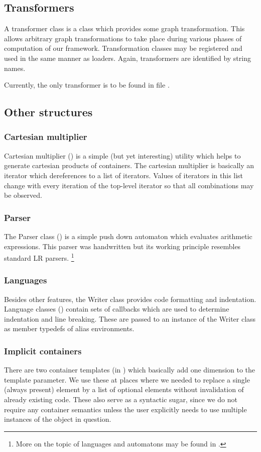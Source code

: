 \subsection*{Transformers}
  A transformer class is a class which provides some graph transformation. This allows arbitrary graph transformations to take place during various phases of computation of our framework. Transformation classes may be registered and used in the same manner as loaders. Again, transformers are identified by string names.

  Currently, the only transformer is to be found in file .

\subsection*{Other structures}

\subsubsection{Cartesian multiplier}
   Cartesian multiplier () is a simple (but yet interesting) utility which helps to generate cartesian products of containers. The cartesian multiplier is basically an iterator which dereferences to a list of iterators. Values of iterators in this list change with every iteration of the top-level iterator so that all combinations may be observed.

\subsubsection{Parser}
  The Parser class () is a simple push down automaton which evaluates arithmetic expressions. This parser was handwritten but its working principle resembles standard LR parsers. \footnote{More on the topic of languages and automatons may be found in \cite{automatons}.}

\subsubsection{Languages}
  Besides other features, the Writer class provides code formatting and indentation. Language classes () contain sets of callbacks which are used to determine indentation and line breaking. These are passed to an instance of the Writer class as member typedefs of alias environments.

\subsubsection{Implicit containers}
  There are two container templates (in ) which basically add one dimension to the template parameter. We use these at places where we needed to replace a single (always present) element by a list of optional elements without invalidation of already existing code. These also serve as a syntactic sugar, since we do not require any container semantics unless the user explicitly needs to use multiple instances of the object in question.

